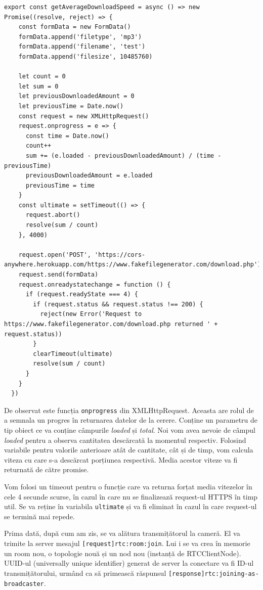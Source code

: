 \begin{lstlisting}
export const getAverageDownloadSpeed = async () => new Promise((resolve, reject) => {
    const formData = new FormData()
    formData.append('filetype', 'mp3')
    formData.append('filename', 'test')
    formData.append('filesize', 10485760)
  
    let count = 0
    let sum = 0
    let previousDownloadedAmount = 0
    let previousTime = Date.now()
    const request = new XMLHttpRequest()
    request.onprogress = e => {
      const time = Date.now()
      count++
      sum += (e.loaded - previousDownloadedAmount) / (time - previousTime)
      previousDownloadedAmount = e.loaded
      previousTime = time
    }
    const ultimate = setTimeout(() => {
      request.abort()
      resolve(sum / count)
    }, 4000)
  
    request.open('POST', 'https://cors-anywhere.herokuapp.com/https://www.fakefilegenerator.com/download.php')
    request.send(formData)
    request.onreadystatechange = function () {
      if (request.readyState === 4) {
        if (request.status && request.status !== 200) {
          reject(new Error('Request to https://www.fakefilegenerator.com/download.php returned ' + request.status))
        }
        clearTimeout(ultimate)
        resolve(sum / count)
      }
    }
  })
\end{lstlisting}
\indent \par De observat este funcția \texttt{onprogress} din XMLHttpRequest. Aceasta are rolul de a semnala un progres în returnarea datelor de la cerere. Conține un parametru de tip obiect ce va conține câmpurile \textit{loaded} și \textit{total}. Noi vom avea nevoie de câmpul \textit{loaded} pentru a observa cantitatea descărcată la momentul respectiv. Folosind variabile pentru valorile anterioare atât de cantitate, cât și de timp, vom calcula viteza cu care s-a descărcat porțiunea respectivă. Media acestor viteze va fi returnată de către promise. 
\indent \par Vom folosi un timeout pentru o funcție care va returna forțat media vitezelor în cele 4 secunde scurse, în cazul în care nu se finalizează request-ul HTTPS în timp util. Se va reține în variabila \texttt{ultimate} și va fi eliminat în cazul în care request-ul se termină mai repede.
\indent \par Prima dată, după cum am zis, se va alătura transmițătorul la cameră. El va trimite la server mesajul \texttt{[request]rtc:room:join}. Lui i se va crea în memorie un room nou, o topologie nouă și un nod nou (instanță de RTCClientNode). UUID-ul (universally unique identifier) generat de server la conectare va fi ID-ul transmițătorului, urmând ca să primească răspunsul \texttt{[response]rtc:joining-as-broadcaster}.

